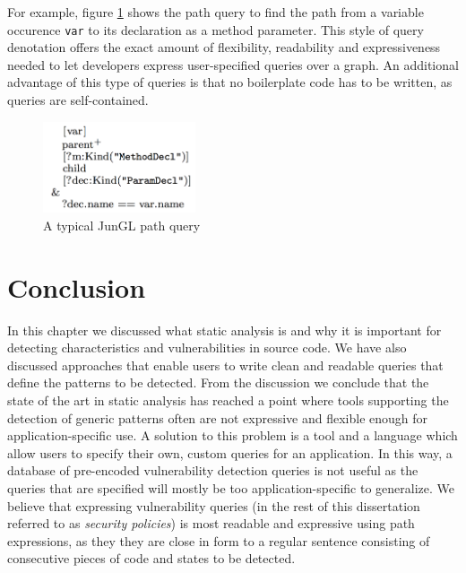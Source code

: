 For example, figure \ref{fig:JunGL} shows the path query to find the path from a variable occurence \texttt{var} to its declaration as a method parameter. This style of query denotation offers the exact amount of flexibility, readability and expressiveness needed to let developers express user-specified queries over a graph. An additional advantage of this type of queries is that no boilerplate code has to be written, as queries are self-contained.

\begin{figure}[!ht]
    \centering
      \includegraphics[width=0.4\textwidth]{images/JunGL} 
      \caption{A typical JunGL path query}
    \label{fig:JunGL}
\end{figure}

\section{Conclusion}
In this chapter we discussed what static analysis is and why it is important for detecting characteristics and vulnerabilities in source code. We have also discussed approaches that enable users to write clean and readable queries that define the patterns to be detected. From the discussion we conclude that the state of the art in static analysis has reached a point where tools supporting the detection of generic patterns often are not expressive and flexible enough for application-specific use. A solution to this problem is a tool and a language which allow users to specify their own, custom queries for an application. In this way, a database of pre-encoded vulnerability detection queries is not useful as the queries that are specified will mostly be too application-specific to generalize. We believe that expressing vulnerability queries (in the rest of this dissertation referred to as \textit{security policies}) is most readable and expressive using path expressions, as they they are close in form to a regular sentence consisting of consecutive pieces of code and states to be detected.


